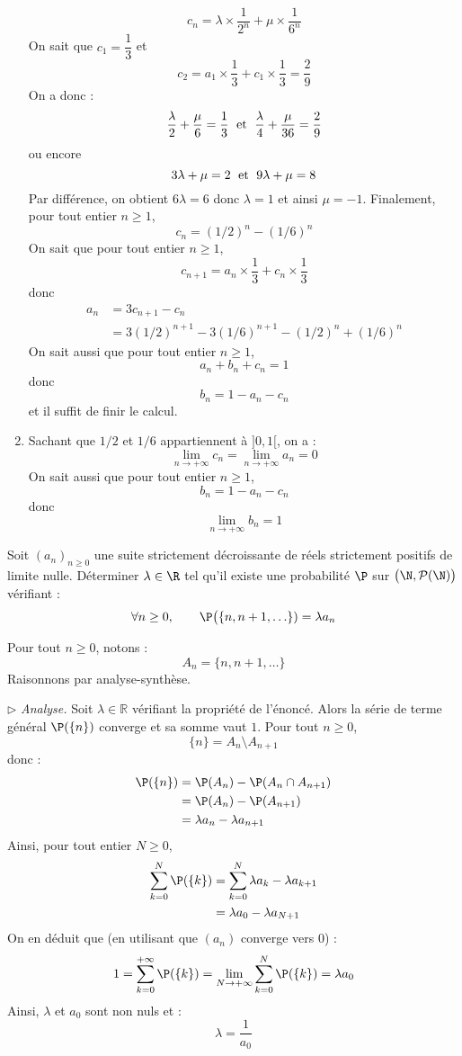 \documentclass[a4paper,10pt]{report}
\begin{document}
\begin{enumerate}
$$ c_n = \lambda \times \dfrac{1}{2^n} + \mu \times \dfrac{1}{6^n}$$
On sait que $c_1= \dfrac{1}{3}$ et 
$$ c_2 = a_1 \times \dfrac{1}{3} + c_1 \times \dfrac{1}{3} = \dfrac{2}{9}$$
On a donc :
$$ \dfrac{\lambda}{2} + \dfrac{\mu}{6} = \dfrac{1}{3} \; \hbox{ et } \; \dfrac{\lambda}{4} + \dfrac{\mu}{36} = \dfrac{2}{9}$$
ou encore 
$$ 3 \lambda + \mu = 2 \; \hbox{ et } \; 9 \lambda + \mu = 8$$
Par différence, on obtient $6 \lambda = 6$ donc $\lambda=1$ et ainsi $\mu=-1$. Finalement, pour tout entier $n \geq 1$,
$$c_n = (1/2)^n-(1/6)^n$$
On sait que pour tout entier $n \geq 1$,
$$c_{n+1} = a_n \times \dfrac{1}{3} + c_n \times \dfrac{1}{3}$$
donc 
\begin{align*}
 a_n & = 3c_{n+1}-c_n  \\
 & = 3 (1/2)^{n+1}-3(1/6)^{n+1} - (1/2)^n+(1/6)^n
 \end{align*}
On sait aussi que pour tout entier $n \geq 1$,
$$ a_n + b_n + c_n  = 1$$
donc 
$$ b_n = 1-a_n -c_n$$
et il suffit de finir le calcul.
\item Sachant que $1/2$ et $1/6$ appartiennent à $]0,1[$, on a :
$$ \lim_{n \rightarrow + \infty} c_n =  \lim_{n \rightarrow + \infty} a_n = 0$$
On sait aussi que pour tout entier $n \geq 1$,
$$  b_n = 1-a_n -c_n$$
donc 
$$\lim_{n \rightarrow + \infty} b_n = 1$$
\end{enumerate}

\begin{Exa} Soit $(a_n)_{n \geq 0}$ une suite strictement décroissante de réels strictement positifs de limite nulle.  Déterminer $\lambda \in \R$ tel qu'il existe une probabilité $\P$ sur $\bigl(\N,\mathcal{P}(\N)\bigr)$ vérifiant :
    \[
    \forall n \geq 0, \qquad \P\bigl( \lbrace n, n+1, \ldots \rbrace) = \lambda a_n
    \]
\end{Exa} 

\corr Pour tout $n \geq 0$, notons :
$$ A_n = \lbrace n, n+1, \ldots \rbrace$$
Raisonnons par analyse-synthèse.

\medskip

\noindent $\rhd$ \textit{Analyse.} Soit $\lambda \in \mathbb{R}$ vérifiant la propriété de l'énoncé. Alors la série de terme général $\P (\lbrace n \rbrace)$ converge et sa somme vaut $1$. Pour tout $n \geq 0$,
$$ \lbrace n \rbrace = A_n \setminus A_{n+1}$$
donc :
\begin{align*}
 \P (\lbrace n \rbrace) & = \P (A_n) - \P (A_n \cap A_{n+1}) \\
 & = \P (A_n) - \P (A_{n+1}) \\
 & = \lambda a_n - \lambda a_{n+1}
 \end{align*}
Ainsi, pour tout entier $N \geq 0$,
\begin{align*}
\sum_{k=0}^N  \P (\lbrace k \rbrace) & = \sum_{k=0}^N\lambda a_k - \lambda a_{k+1} \\
& = \lambda a_0 - \lambda a_{N+1} 
\end{align*}
On en déduit que (en utilisant que $(a_n)$ converge vers $0$) :
$$ 1 = \sum_{k=0}^{+ \infty}  \P (\lbrace k \rbrace) = \lim_{N \rightarrow + \infty} \sum_{k=0}^N  \P (\lbrace k \rbrace) = \lambda a_0$$
Ainsi, $\lambda$ et $a_0$ sont non nuls et :
$$ \lambda = \dfrac{1}{a_0}$$
\end{document}
